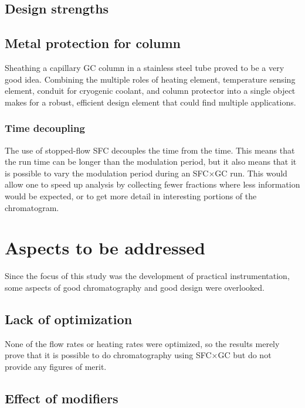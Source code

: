 \subsection{Design strengths}

\subsection{Metal protection for column}

Sheathing a capillary GC column in a stainless steel tube proved to be a very
good idea. Combining the multiple roles of heating element, temperature sensing
element, conduit for cryogenic coolant, and column protector into a single
object makes for a robust, efficient design element that could find multiple
applications.

\subsubsection{Time decoupling}

The use of stopped-flow SFC decouples the \oneD time from the \twoD time. This
means that the \twoD run time can be longer than the modulation period, but it
also means that it is possible to vary the modulation period during an SFC×GC
run. This would allow one to speed up analysis by collecting fewer fractions
where less information would be expected, or to get more detail in interesting
portions of the \oneD chromatogram.


\section{Aspects to be addressed} 

Since the focus of this study was the development of practical instrumentation,
some aspects of good chromatography and good design were overlooked.

\subsection{Lack of optimization}

None of the flow rates or heating rates were optimized, so the results merely
prove that it is possible to do chromatography using SFC×GC but do not provide
any figures of merit.

\subsection{Effect of modifiers}

